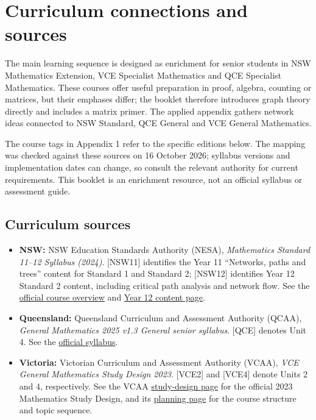 \chapter*{Curriculum connections and sources}
The main learning sequence is designed as enrichment for senior students in NSW Mathematics Extension, VCE Specialist Mathematics and QCE Specialist Mathematics. These courses offer useful preparation in proof, algebra, counting or matrices, but their emphases differ; the booklet therefore introduces graph theory directly and includes a matrix primer. The applied appendix gathers network ideas connected to NSW Standard, QCE General and VCE General Mathematics.

The course tags in Appendix 1 refer to the specific editions below. The mapping was checked against these sources on 16 October 2026; syllabus versions and implementation dates can change, so consult the relevant authority for current requirements. This booklet is an enrichment resource, not an official syllabus or assessment guide.

\section*{Curriculum sources}
\begin{itemize}
\item \textbf{NSW:} NSW Education Standards Authority (NESA), \emph{Mathematics Standard 11--12 Syllabus (2024)}. [NSW11] identifies the Year 11 ``Networks, paths and trees'' content for Standard 1 and Standard 2; [NSW12] identifies Year 12 Standard 2 content, including critical path analysis and network flow. See the \href{https://curriculum.nsw.edu.au/learning-areas/mathematics/mathematics-standard-11-12-2024/overview/course}{official course overview} and \href{https://curriculum.nsw.edu.au/learning-areas/mathematics/mathematics-standard-11-12-2024/content/year-12/fa493dfdfb}{Year 12 content page}.
\item \textbf{Queensland:} Queensland Curriculum and Assessment Authority (QCAA), \emph{General Mathematics 2025 v1.3 General senior syllabus}. [QCE] denotes Unit 4. See the \href{https://www.qcaa.qld.edu.au/downloads/senior-qce/syllabuses/snr_maths_general_25_syll.pdf}{official syllabus}.
\item \textbf{Victoria:} Victorian Curriculum and Assessment Authority (VCAA), \emph{VCE General Mathematics Study Design 2023}. [VCE2] and [VCE4] denote Units 2 and 4, respectively. See the VCAA \href{https://vcaa.vic.edu.au/curriculum/vce-curriculum/vce-study-designs/general-mathematics/vce-general-mathematics}{study-design page} for the official 2023 Mathematics Study Design, and its \href{https://www.vcaa.vic.edu.au/curriculum/vce-curriculum/vce-study-designs/general-mathematics/planning}{planning page} for the course structure and topic sequence.
\end{itemize}

